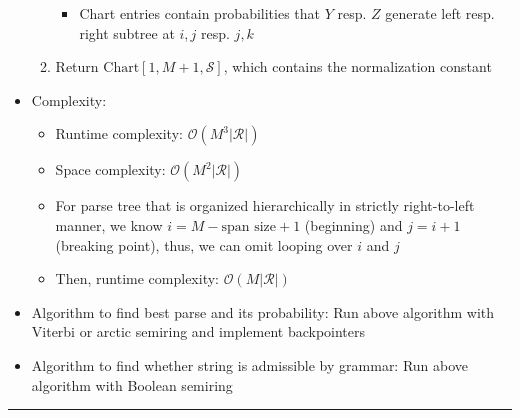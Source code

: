 \begin{itemize}
\begin{enumerate}
\begin{itemize}
            \item Chart entries contain probabilities that $Y$  resp. $Z$ generate left resp. right subtree at $i,j$ resp. $j,k$
        \end{itemize}
        \item Return $\textrm{Chart}[1, M+1, \mathcal{S}]$, which contains the normalization constant
    \end{enumerate}
    \item Complexity:
    \begin{itemize}
        \item Runtime complexity: $\mathcal{O}(M^3 |\mathcal{R}|)$
        \item Space complexity: $\mathcal{O}(M^2 |\mathcal{R}|)$
        \item For parse tree that is organized hierarchically in strictly right-to-left manner, we know $i = M - \textrm{span size} + 1$ (beginning) and $j = i+1$ (breaking point), thus, we can omit looping over $i$ and $j$
        \item Then, runtime complexity: $\mathcal{O}(M |\mathcal{R}|)$
    \end{itemize}
    \item Algorithm to find best parse and its probability: Run above algorithm with Viterbi or arctic semiring and implement backpointers
    \item Algorithm to find whether string is admissible by grammar: Run above algorithm with Boolean semiring
\end{itemize}

{\color{black}\hrule height 0.001mm}

